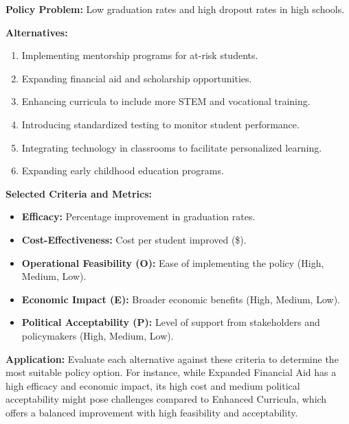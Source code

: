 \documentclass{article}
\theoremstyle{definition}
\theoremstyle{plain}
\begin{document}
\begin{tcolorbox}[colback=gray!5!white, colframe=gray!75!black, title=Example: Applying Criteria to Education Policy Alternatives]

\textbf{Policy Problem:} Low graduation rates and high dropout rates in high schools.

\textbf{Alternatives:}

\begin{enumerate}[label=\alph*.]
    \item Implementing mentorship programs for at-risk students.
    \item Expanding financial aid and scholarship opportunities.
    \item Enhancing curricula to include more STEM and vocational training.
    \item Introducing standardized testing to monitor student performance.
    \item Integrating technology in classrooms to facilitate personalized learning.
    \item Expanding early childhood education programs.
\end{enumerate}

\textbf{Selected Criteria and Metrics:}

\begin{itemize}
    \item \textbf{Efficacy:} Percentage improvement in graduation rates.
    \item \textbf{Cost-Effectiveness:} Cost per student improved (\$).
    \item \textbf{Operational Feasibility (O):} Ease of implementing the policy (High, Medium, Low).
    \item \textbf{Economic Impact (E):} Broader economic benefits (High, Medium, Low).
    \item \textbf{Political Acceptability (P):} Level of support from stakeholders and policymakers (High, Medium, Low).
\end{itemize}

\textbf{Application:} Evaluate each alternative against these criteria to determine the most suitable policy option. For instance, while Expanded Financial Aid has a high efficacy and economic impact, its high cost and medium political acceptability might pose challenges compared to Enhanced Curricula, which offers a balanced improvement with high feasibility and acceptability.

\end{tcolorbox}
\end{document}
